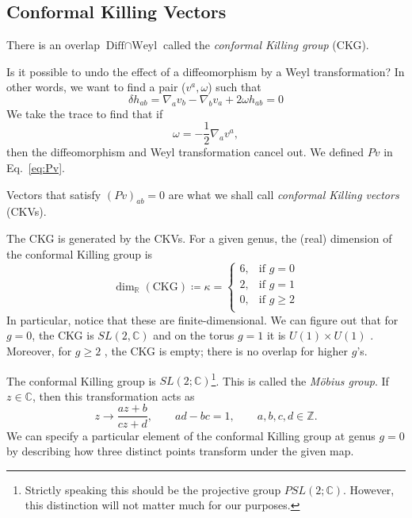 \subsection{Conformal Killing Vectors}%
\label{sub:conformal_killing_vectors}

\begin{definition}
  There is an overlap $\text{Diff} \cap \text{Weyl}$ called the \emph{conformal Killing group} (CKG).
\end{definition}

Is it possible to undo the effect of a diffeomorphism by a Weyl transformation?
In other words, we want to find a pair ($v^a, \omega$) such that
\begin{equation}
  \delta h_{ab} = \nabla_a v_b - \nabla_b v_a + 2 \omega h_{ab} = 0
\end{equation}
We take the trace to find that if
\begin{equation}
  \omega = -\frac{1}{2} \nabla_a v^a,
\end{equation}
then the diffeomorphism and Weyl transformation cancel out.
We defined $Pv$ in Eq.~\eqref{eq:Pv}.
\begin{definition}
  Vectors that satisfy $(Pv)_{ab} = 0$ are what we shall call \emph{conformal Killing vectors} (CKVs).
\end{definition}
The CKG is generated by the CKVs.
For a given genus, the (real) dimension of the conformal Killing group is
\begin{equation}
  \dim_{\mathbb{R}}(\text{CKG}) \coloneqq \kappa =
  \begin{cases}
    6, & \text{if } g = 0 \\
    2, & \text{if } g = 1 \\ 
    0, & \text{if } g \geq 2 \\ 
  \end{cases}
\end{equation}
In particular, notice that these are finite-dimensional.
We can figure out that for $g = 0$, the CKG is $SL(2, \mathbb{C})$  and on the torus $g = 1$  it is $U(1) \times U(1)$ . Moreover, for $g \geq 2$ , the CKG is empty; there is no overlap for higher $g$'s.

\begin{example}[$g = 2$]
  The conformal Killing group is $SL(2; \mathbb{C})$\footnote{Strictly speaking this should be the projective group $PSL(2; \mathbb{C})$. However, this distinction will not matter much for our purposes.}. This is called the \emph{Möbius group}. If $z \in \mathbb{C}$, then this transformation acts as
  \begin{equation}
    z \to \frac{az + b}{cz + d}, \qquad ad - bc = 1, \qquad a,b, c, d \in \mathbb{Z}.
  \end{equation}
  We can specify a particular element of the conformal Killing group at genus $g = 0$ by describing how three distinct points transform under the given map.
\end{example}

